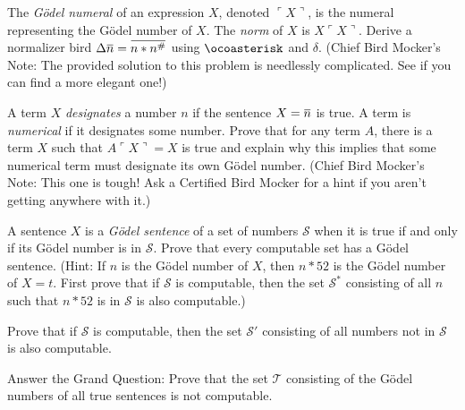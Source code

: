 \documentclass[12pt, letterpaper]{article}
\begin{document}
\begin{prob}{25.2}
The \emph{G\"odel numeral} of an expression $X$, denoted $\ulcorner X \urcorner$, is the numeral representing the G\"odel number of $X$. The \emph{norm} of $X$ is $X\ulcorner X \urcorner$. Derive a normalizer bird $\Delta \noverline{n} = \noverline{n \ast n^\#}$ using $\ocoasterisk$ and $\delta$. (Chief Bird Mocker's Note: The provided solution to this problem is needlessly complicated. See if you can find a more elegant one!)
\end{prob}

\begin{prob}{25.3}
A term $X$ \emph{designates} a number $n$ if the sentence $X = \noverline{n}$ is true. A term is \emph{numerical} if it designates some number. Prove that for any term $A$, there is a term $X$ such that $A\ulcorner X \urcorner = X$ is true and explain why this implies that some numerical term must designate its own G\"odel number. (Chief Bird Mocker's Note: This one is tough! Ask a Certified Bird Mocker for a hint if you aren't getting anywhere with it.)
\end{prob}


\begin{prob}{25.4}
A sentence $X$ is a \emph{G\"odel sentence} of a set of numbers $\mathscr{S}$ when it is true if and only if its G\"odel number is in $\mathscr{S}$. Prove that every computable set has a G\"odel sentence. (Hint: If $n$ is the G\"odel number of $X$, then $n \ast 52$ is the G\"odel number of $X = t$. First prove that if $\mathscr{S}$ is computable, then the set $\mathscr{S}^*$ consisting of all $n$ such that $n \ast 52$ is in $\mathcal{S}$ is also computable.)
\end{prob}

\begin{prob}{25.5}
Prove that if $\mathscr{S}$ is computable, then the set $\mathscr{S}'$ consisting of all numbers not in $\mathscr{S}$ is also computable.
\end{prob}

\begin{prob}{25.5}
Answer the Grand Question: Prove that the set $\mathscr{T}$ consisting of the  G\"odel numbers of all true sentences is not computable.
\end{prob}
\end{document}
